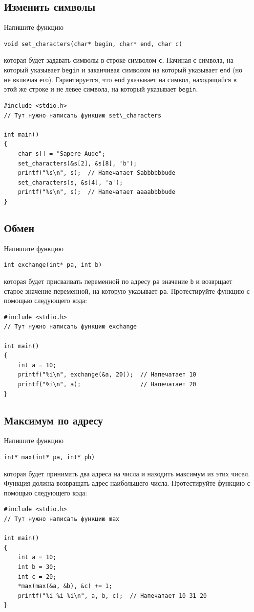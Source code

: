 \documentclass[10pt]{article}
\begin{document}
\subsection{Изменить символы}
Напишите функцию
\begin{lstlisting}
void set_characters(char* begin, char* end, char c)
\end{lstlisting}
которая будет задавать символы в строке символом \texttt{c}. Начиная с символа, на который указывает \texttt{begin} и заканчивая символом на который указывает \texttt{end} (но не включая его). Гарантируется, что \texttt{end} указывает на символ, находящийся в этой же строке и не левее символа, на который указывает \texttt{begin}.
\begin{lstlisting}
#include <stdio.h>
// Тут нужно написать функцию set\_characters

int main() 
{
    char s[] = "Sapere Aude";
    set_characters(&s[2], &s[8], 'b');
    printf("%s\n", s);  // Напечатает Sabbbbbbude
    set_characters(s, &s[4], 'a');
    printf("%s\n", s);  // Напечатает aaaabbbbude
}
\end{lstlisting}


\subsection{Обмен}
Напишите функцию
\begin{lstlisting}
int exchange(int* pa, int b)
\end{lstlisting}
которая будет присваивать переменной по адресу \texttt{pa} значение \texttt{b} и возврщает старое значение переменной, на которую указывает \texttt{pa}. Протестируйте функцию с помощью следующего кода:
\begin{lstlisting}
#include <stdio.h>
// Тут нужно написать функцию exchange

int main() 
{
    int a = 10;
    printf("%i\n", exchange(&a, 20));  // Напечатает 10
    printf("%i\n", a);                 // Напечатает 20
}
\end{lstlisting} 

\subsection{Максимум по адресу}
Напишите функцию
\begin{lstlisting}
int* max(int* pa, int* pb)
\end{lstlisting}
которая будет принимать два адреса на числа и находить максимум из этих чисел.
Функция должна возвращать адрес наибольшего числа. Протестируйте функцию с помощью следующего кода:
\begin{lstlisting}
#include <stdio.h>
// Тут нужно написать функцию max

int main() 
{
    int a = 10;
    int b = 30;
    int c = 20;
    *max(max(&a, &b), &c) += 1;
    printf("%i %i %i\n", a, b, c);  // Напечатает 10 31 20
}
\end{lstlisting} 
\end{document}
